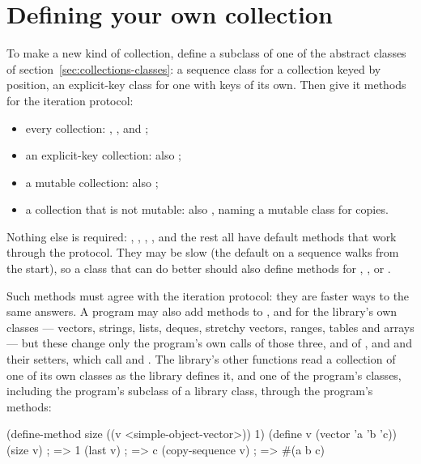 \section{Defining your own collection}\label{sec:collections-own}

To make a new kind of collection, define a subclass of one of the
abstract classes of section~\ref{sec:collections-classes}: a sequence
class for a collection keyed by position, an explicit-key class for one
with keys of its own. Then give it methods for the iteration protocol:

\begin{itemize}
\item every collection: , ,
   and ;
\item an explicit-key collection: also ;
\item a mutable collection: also ;
\item a collection that is not mutable: also ,
  naming a mutable class for copies.
\end{itemize}

\noindent Nothing else is required: , ,
, ,  and the rest all have default
methods that work through the protocol. They may be slow (the default
 on a sequence walks from the start), so a class that can
do better should also define methods for ,
,  or .

Such methods must agree with the iteration protocol: they are faster
ways to the same answers. A program may also add methods to
,  and  for the
library's own classes --- vectors, strings, lists, deques, stretchy
vectors, ranges, tables and arrays --- but these change only the
program's own calls of those three, and of , 
and  and their setters, which call  and
. The library's other functions read a
collection of one of its own classes as the library defines it, and
one of the program's classes, including the program's subclass of a
library class, through the program's methods:

\begin{dylan}
(define-method size ((v <simple-object-vector>)) 1)
(define v (vector 'a 'b 'c))
(size v)                          ; => 1
(last v)                          ; => c
(copy-sequence v)                 ; => #(a b c)
\end{dylan}

